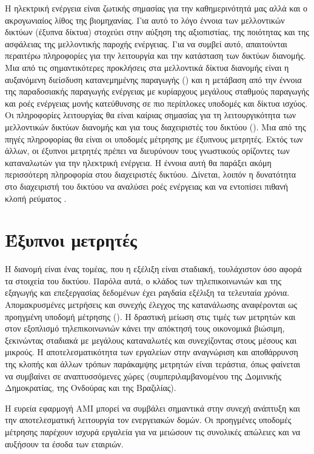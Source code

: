 Η ηλεκτρική ενέργεια είναι ζωτικής σημασίας για την καθημερινότητά μας αλλά και ο ακρογωνιαίος λίθος της βιομηχανίας. Για αυτό το λόγο έννοια των μελλοντικών δικτύων (έξυπνα δίκτυα) στοχεύει στην αύξηση της αξιοπιστίας, της ποιότητας και της ασφάλειας της μελλοντικής παροχής ενέργειας. Για να συμβεί αυτό, απαιτούνται περαιτέρω πληροφορίες για την λειτουργία και την κατάσταση των δικτύων διανομής. Μια από τις σημαντικότερες προκλήσεις στα μελλοντικά δίκτυα διανομής είναι η αυξανόμενη διείσδυση κατανεμημένης παραγωγής () και η μετάβαση από την έννοια της παραδοσιακής παραγωγής ενέργειας με κυρίαρχους μεγάλους σταθμούς παραγωγής και ροές ενέργειας μονής κατεύθυνσης σε πιο περίπλοκες υποδομές και δίκτυα ισχύος. Οι πληροφορίες λειτουργίας θα είναι καίριας σημασίας για τη λειτουργικότητα των μελλοντικών δικτύων διανομής και για τους διαχειριστές του δικτύου (). Μια από της πηγές πληροφορίας θα είναι οι υποδομές μέτρησης με έξυπνους μετρητές. Εκτός των άλλων, οι έξυπνοι μετρητές πρέπει να διευρύνουν τους γνωστικούς ορίζοντες των καταναλωτών για την ηλεκτρική ενέργεια. Η έννοια αυτή θα παράξει ακόμη περισσότερη πληροφορία στου διαχειριστές δικτύου. Δίνεται, λοιπόν η δυνατότητα στο διαχειριστή του δικτύου να αναλύσει ροές ενέργειας και να εντοπίσει πιθανή κλοπή ρεύματος \cite{netherlands}. \\
\section{Έξυπνοι μετρητές}
Η διανομή είναι ένας τομέας, που η εξέλιξη είναι σταδιακή, τουλάχιστον όσο αφορά τα στοιχεία του δικτύου. Παρόλα αυτά, ο κλάδος των τηλεπικοινωνιών και της εξαγωγής και επεξεργασίας δεδομένων έχει ραγδαία εξέλιξη τα τελευταία χρόνια. Απομακρυσμένες μετρήσεις και συνεχής έλεγχος της κατανάλωσης αναφέρονται ως προηγμένη υποδομή μέτρησης (). Η δραστική μείωση στις τιμές των μετρητών και στον εξοπλισμό τηλεπικοινωνιών κάνει την απόκτησή τους οικονομικά βιώσιμη, ξεκινώντας σταδιακά με μεγάλους καταναλωτές και συνεχίζοντας στους μέσους και μικρούς. Η αποτελεσματικότητα των εργαλείων στην αναγνώριση και αποθάρρυνση της κλοπής και άλλων τρόπων παράκαμψης μετρητών είναι τεράστια, όπως φαίνεται να συμβαίνει σε αναπτυσσόμενες χώρες (συμπεριλαμβανομένου της Δομινικής Δημοκρατίας, της Ονδούρας και της Βραζιλίας).\par
Η ευρεία εφαρμογή AMI μπορεί να συμβάλει σημαντικά στην συνεχή ανάπτυξη και την αποτελεσματική λειτουργία τον ενεργειακών δομών. Οι προηγμένες υποδομές μέτρησης παρέχουν ισχυρά εργαλεία για να μειώσουν τις συνολικές απώλειες και να αυξήσουν τα έσοδα των εταιριών.
